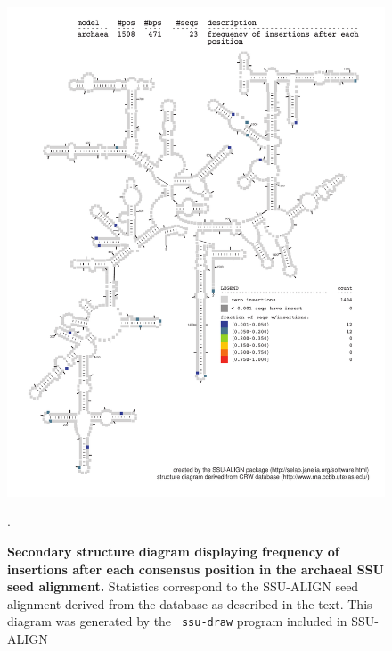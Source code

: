 \begin{figure}
\begin{center}
\includegraphics[width=5.7in]{Figures/archaea-0p1-ifreq}
\end{center}
\caption[Secondary structure diagram displaying frequency of insertions
  after each consensus position in the archaeal SSU seed
  alignment]{\textbf{Secondary structure diagram displaying frequency
  of insertions after each consensus position in the archaeal SSU seed
  alignment.} Statistics correspond to the SSU-ALIGN seed
  alignment derived from the  database \cite{CannoneGutell02}
  as described in the text. This diagram was generated by the {\tt
  ssu-draw} program included in SSU-ALIGN}.
\label{fig:arcifreq}
\end{figure}

\newpage 

